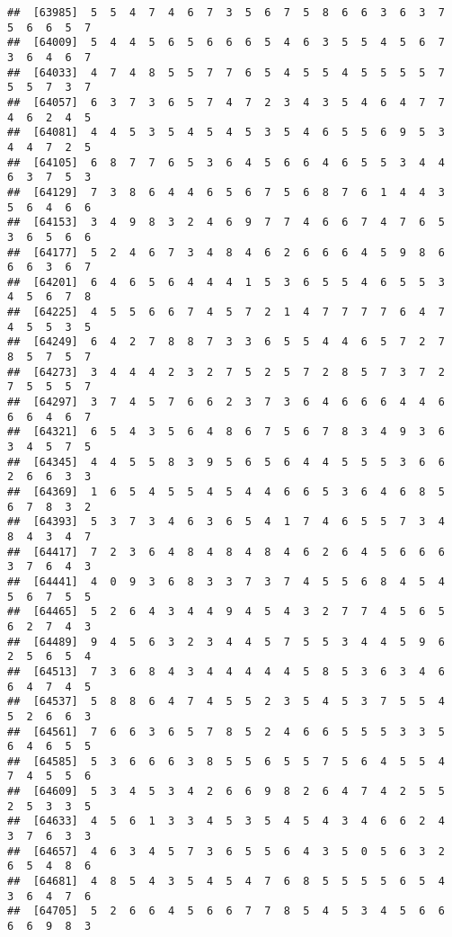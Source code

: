 \documentclass[
]{book}
\begin{document}
\begin{verbatim}
##  [63985]  5  5  4  7  4  6  7  3  5  6  7  5  8  6  6  3  6  3  7  5  6  6  5  7
##  [64009]  5  4  4  5  6  5  6  6  6  5  4  6  3  5  5  4  5  6  7  3  6  4  6  7
##  [64033]  4  7  4  8  5  5  7  7  6  5  4  5  5  4  5  5  5  5  7  5  5  7  3  7
##  [64057]  6  3  7  3  6  5  7  4  7  2  3  4  3  5  4  6  4  7  7  4  6  2  4  5
##  [64081]  4  4  5  3  5  4  5  4  5  3  5  4  6  5  5  6  9  5  3  4  4  7  2  5
##  [64105]  6  8  7  7  6  5  3  6  4  5  6  6  4  6  5  5  3  4  4  6  3  7  5  3
##  [64129]  7  3  8  6  4  4  6  5  6  7  5  6  8  7  6  1  4  4  3  5  6  4  6  6
##  [64153]  3  4  9  8  3  2  4  6  9  7  7  4  6  6  7  4  7  6  5  3  6  5  6  6
##  [64177]  5  2  4  6  7  3  4  8  4  6  2  6  6  6  4  5  9  8  6  6  6  3  6  7
##  [64201]  6  4  6  5  6  4  4  4  1  5  3  6  5  5  4  6  5  5  3  4  5  6  7  8
##  [64225]  4  5  5  6  6  7  4  5  7  2  1  4  7  7  7  7  6  4  7  4  5  5  3  5
##  [64249]  6  4  2  7  8  8  7  3  3  6  5  5  4  4  6  5  7  2  7  8  5  7  5  7
##  [64273]  3  4  4  4  2  3  2  7  5  2  5  7  2  8  5  7  3  7  2  7  5  5  5  7
##  [64297]  3  7  4  5  7  6  6  2  3  7  3  6  4  6  6  6  4  4  6  6  6  4  6  7
##  [64321]  6  5  4  3  5  6  4  8  6  7  5  6  7  8  3  4  9  3  6  3  4  5  7  5
##  [64345]  4  4  5  5  8  3  9  5  6  5  6  4  4  5  5  5  3  6  6  2  6  6  3  3
##  [64369]  1  6  5  4  5  5  4  5  4  4  6  6  5  3  6  4  6  8  5  6  7  8  3  2
##  [64393]  5  3  7  3  4  6  3  6  5  4  1  7  4  6  5  5  7  3  4  8  4  3  4  7
##  [64417]  7  2  3  6  4  8  4  8  4  8  4  6  2  6  4  5  6  6  6  3  7  6  4  3
##  [64441]  4  0  9  3  6  8  3  3  7  3  7  4  5  5  6  8  4  5  4  5  6  7  5  5
##  [64465]  5  2  6  4  3  4  4  9  4  5  4  3  2  7  7  4  5  6  5  6  2  7  4  3
##  [64489]  9  4  5  6  3  2  3  4  4  5  7  5  5  3  4  4  5  9  6  2  5  6  5  4
##  [64513]  7  3  6  8  4  3  4  4  4  4  4  5  8  5  3  6  3  4  6  6  4  7  4  5
##  [64537]  5  8  8  6  4  7  4  5  5  2  3  5  4  5  3  7  5  5  4  5  2  6  6  3
##  [64561]  7  6  6  3  6  5  7  8  5  2  4  6  6  5  5  5  3  3  5  6  4  6  5  5
##  [64585]  5  3  6  6  6  3  8  5  5  6  5  5  7  5  6  4  5  5  4  7  4  5  5  6
##  [64609]  5  3  4  5  3  4  2  6  6  9  8  2  6  4  7  4  2  5  5  2  5  3  3  5
##  [64633]  4  5  6  1  3  3  4  5  3  5  4  5  4  3  4  6  6  2  4  3  7  6  3  3
##  [64657]  4  6  3  4  5  7  3  6  5  5  6  4  3  5  0  5  6  3  2  6  5  4  8  6
##  [64681]  4  8  5  4  3  5  4  5  4  7  6  8  5  5  5  5  6  5  4  3  6  4  7  6
##  [64705]  5  2  6  6  4  5  6  6  7  7  8  5  4  5  3  4  5  6  6  6  6  9  8  3

\end{verbatim}
\end{document}
